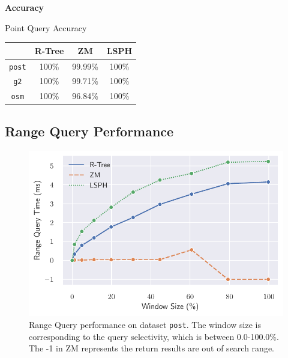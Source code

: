 \textbf{Accuracy}


\begin{center}
\begin{adjustbox}{max width={\textwidth}, max totalheight={\textheight},keepaspectratio}
\begin{threeparttable}
\caption{Point Query Accuracy}
\begin{tabular}{c|c c c}
    \toprule
        &\textbf{R-Tree}  & \textbf{ZM} & \textbf{LSPH}             \\ \midrule 
    \texttt{post}    & 100\% & 99.99\% & 100\% \\
    \texttt{g2}      & 100\% & 99.71\% & 100\%  \\
    \texttt{osm}     & 100\% & 96.84\% & 100\% \\
     \bottomrule
\end{tabular}
\end{threeparttable}
\label{table:accuracy}
\end{adjustbox}
\end{center}



\subsection{Range Query Performance}
\begin{figure}
    \includegraphics[width=\textwidth]{Figures/range_result.pdf}\hfill
    \caption{Range Query performance on dataset \texttt{post}. The window size is corresponding to the query selectivity, which is between 0.0-100.0\%. The -1 in ZM represents the return results are out of search range.}\label{fig:range_result}
\end{figure}